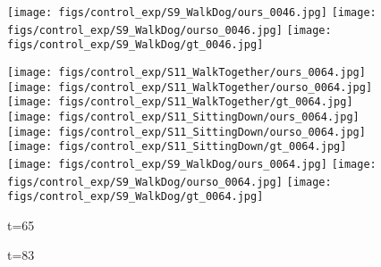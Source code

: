 \documentclass{article}
\begin{document}
\begin{appendix}
\begin{figure*}[!thbp]
\begin{subfigure}{0.12\linewidth}
  		\texttt{[image: figs/control\_exp/S9\_WalkDog/ours\_0046.jpg]}
  		\texttt{[image: figs/control\_exp/S9\_WalkDog/ourso\_0046.jpg]}
  		\vspace{.2cm}
  		\texttt{[image: figs/control\_exp/S9\_WalkDog/gt\_0046.jpg]}
	\end{subfigure} 
    \begin{subfigure}{0.12\linewidth}
        \caption*{t=65}
        \vspace{-7pt}
	    \texttt{[image: figs/control\_exp/S11\_WalkTogether/ours\_0064.jpg]}
	    \texttt{[image: figs/control\_exp/S11\_WalkTogether/ourso\_0064.jpg]}
	    \vspace{.2cm}
  		\texttt{[image: figs/control\_exp/S11\_WalkTogether/gt\_0064.jpg]}
  		\texttt{[image: figs/control\_exp/S11\_SittingDown/ours\_0064.jpg]}
  		\texttt{[image: figs/control\_exp/S11\_SittingDown/ourso\_0064.jpg]}
  		\vspace{.2cm}
  		\texttt{[image: figs/control\_exp/S11\_SittingDown/gt\_0064.jpg]}
  		\texttt{[image: figs/control\_exp/S9\_WalkDog/ours\_0064.jpg]}
  		\texttt{[image: figs/control\_exp/S9\_WalkDog/ourso\_0064.jpg]}
  		\vspace{.2cm}
  		\texttt{[image: figs/control\_exp/S9\_WalkDog/gt\_0064.jpg]}
	\end{subfigure}
	\begin{subfigure}{0.12\linewidth}
        \caption*{t=83}
        \vspace{-7pt}

\end{subfigure}
\end{figure*}
\end{appendix}
\end{document}
